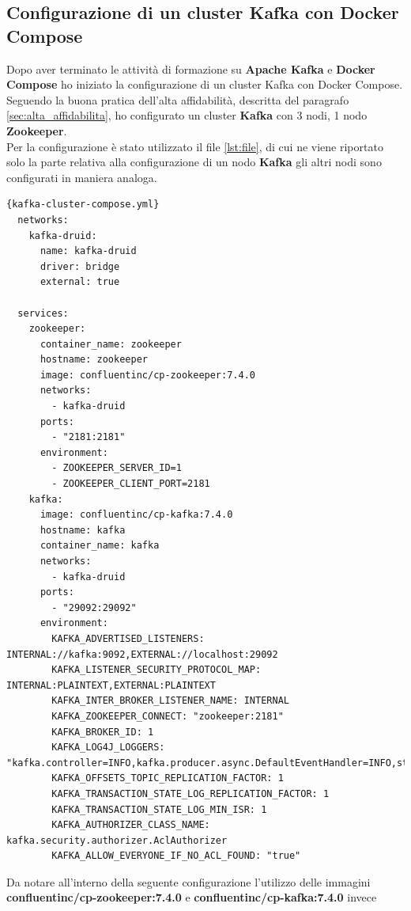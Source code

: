 \subsection{Configurazione di un cluster Kafka con Docker Compose}
Dopo aver terminato le attività di formazione su \textbf{Apache Kafka} e \textbf{Docker Compose} 
ho iniziato la configurazione di un cluster Kafka con Docker Compose. 
\\Seguendo la buona pratica dell'alta affidabilità, descritta del 
paragrafo \ref{sec:alta_affidabilita}, ho configurato un cluster \textbf{Kafka} con 3 nodi, 1 nodo \textbf{Zookeeper}.\\
Per la configurazione è stato utilizzato il file \ref{lst:file}, di cui ne viene riportato solo la parte relativa alla configurazione di un nodo \textbf{Kafka} gli altri nodi sono configurati in maniera analoga.
\pagebreak
\begin{lstlisting}[caption=\texttt{kafka-cluster-compose.yml}, label=lst:file]{kafka-cluster-compose.yml}
  networks:
    kafka-druid:
      name: kafka-druid
      driver: bridge
      external: true
  
  services:
    zookeeper:
      container_name: zookeeper
      hostname: zookeeper
      image: confluentinc/cp-zookeeper:7.4.0
      networks: 
        - kafka-druid
      ports:
        - "2181:2181"
      environment:
        - ZOOKEEPER_SERVER_ID=1
        - ZOOKEEPER_CLIENT_PORT=2181
    kafka:
      image: confluentinc/cp-kafka:7.4.0
      hostname: kafka
      container_name: kafka
      networks:
        - kafka-druid
      ports:
        - "29092:29092"
      environment:
        KAFKA_ADVERTISED_LISTENERS: INTERNAL://kafka:9092,EXTERNAL://localhost:29092
        KAFKA_LISTENER_SECURITY_PROTOCOL_MAP: INTERNAL:PLAINTEXT,EXTERNAL:PLAINTEXT
        KAFKA_INTER_BROKER_LISTENER_NAME: INTERNAL
        KAFKA_ZOOKEEPER_CONNECT: "zookeeper:2181"
        KAFKA_BROKER_ID: 1
        KAFKA_LOG4J_LOGGERS: "kafka.controller=INFO,kafka.producer.async.DefaultEventHandler=INFO,state.change.logger=INFO"
        KAFKA_OFFSETS_TOPIC_REPLICATION_FACTOR: 1
        KAFKA_TRANSACTION_STATE_LOG_REPLICATION_FACTOR: 1
        KAFKA_TRANSACTION_STATE_LOG_MIN_ISR: 1
        KAFKA_AUTHORIZER_CLASS_NAME: kafka.security.authorizer.AclAuthorizer
        KAFKA_ALLOW_EVERYONE_IF_NO_ACL_FOUND: "true"  
\end{lstlisting}   
Da notare all'interno della seguente configurazione l'utilizzo delle immagini\\ \textbf{confluentinc/cp-zookeeper:7.4.0} e \textbf{confluentinc/cp-kafka:7.4.0} invece 
